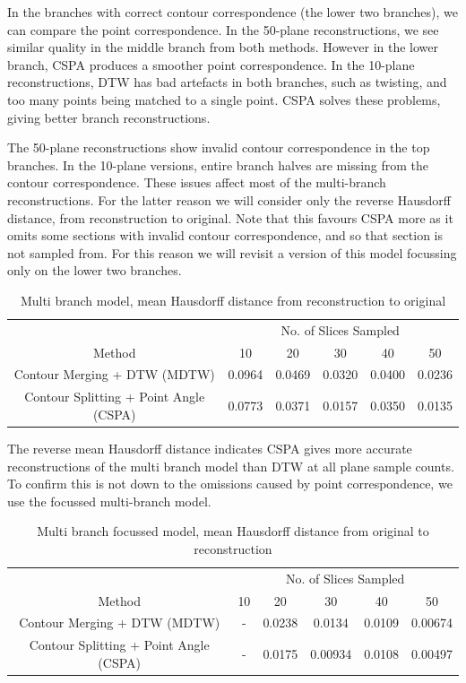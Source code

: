 \documentclass[11p, titlepage]{article}
\begin{document}
In the branches with correct contour correspondence (the lower two branches), we can compare the point correspondence. In the 50-plane reconstructions, we see similar quality in the middle branch from both methods. However in the lower branch, CSPA produces a smoother point correspondence. In the 10-plane reconstructions, DTW has bad artefacts in both branches, such as twisting, and too many points being matched to a single point. CSPA solves these problems, giving better branch reconstructions.

The 50-plane reconstructions show invalid contour correspondence in the top branches. In the 10-plane versions, entire branch halves are missing from the contour correspondence. These issues affect most of the multi-branch reconstructions. For the latter reason we will consider only the reverse Hausdorff distance, from reconstruction to original. Note that this favours CSPA more as it omits some sections with invalid contour correspondence, and so that section is not sampled from. For this reason we will revisit a version of this model focussing only on the lower two branches.

\begin{table}[h]
\begin{tabular}{ | c | c | c | c | c | c | }
\hline
& \multicolumn{5}{c|}{No. of Slices Sampled} \\
\cline{2-6}
Method & 10 & 20 & 30 & 40 & 50 \\
\hline
Contour Merging + DTW (MDTW) & 0.0964 & 0.0469 & 0.0320 & 0.0400 & 0.0236 \\
Contour Splitting + Point Angle (CSPA) & 0.0773 & 0.0371 & 0.0157 & 0.0350 & 0.0135 \\
\hline
\end{tabular}
\caption{Multi branch model, mean Hausdorff distance from reconstruction to original}
\label{table:multi_branch_reverse}
\end{table}

The reverse mean Hausdorff distance indicates CSPA gives more accurate reconstructions of the multi branch model than DTW at all plane sample counts. To confirm this is not down to the omissions caused by point correspondence, we use the focussed multi-branch model.

\begin{table}[h]
\begin{tabular}{ | c | c | c | c | c | c | }
\hline
& \multicolumn{5}{c|}{No. of Slices Sampled} \\
\cline{2-6}
Method & 10 & 20 & 30 & 40 & 50 \\
\hline
Contour Merging + DTW (MDTW) & - & 0.0238 & 0.0134 & 0.0109 & 0.00674 \\
Contour Splitting + Point Angle (CSPA) & - & 0.0175 & 0.00934 & 0.0108 & 0.00497 \\
\hline
\end{tabular}
\caption{Multi branch focussed model, mean Hausdorff distance from original to reconstruction}
\label{table:multi_branch_focussed_forward}
\end{table}
\end{document}
